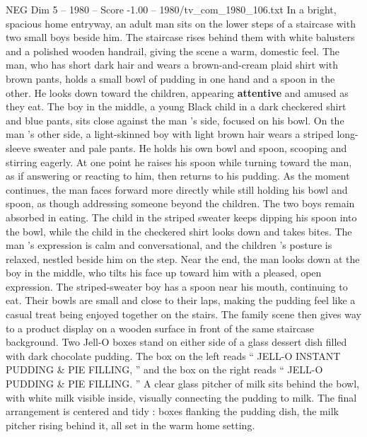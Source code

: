 \begin{textsample}{NEG Dim 5 – 1980 – Score -1.00 – 1980/tv\_com\_1980\_106.txt}  \label{ex:f5_neg_069}
In a bright, spacious home entryway, an adult man sits on the lower steps of a staircase with two small boys beside him.
The staircase rises behind them with white balusters and a polished wooden handrail, giving the scene a warm, domestic feel.
The man, who has short dark hair and wears a brown-and-cream plaid shirt with brown pants, holds a small bowl of pudding in one hand and a spoon in the other.
He looks down toward the children, appearing \textbf{attentive} and amused as they eat.
The boy in the middle, a young Black child in a dark checkered shirt and blue pants, sits close against the man ’s side, focused on his bowl.
On the man ’s other side, a light-skinned boy with light brown hair wears a striped long-sleeve sweater and pale pants.
He holds his own bowl and spoon, scooping and stirring eagerly.
At one point he raises his spoon while turning toward the man, as if answering or reacting to him, then returns to his pudding.
As the moment continues, the man faces forward more directly while still holding his bowl and spoon, as though addressing someone beyond the children.
The two boys remain absorbed in eating.
The child in the striped sweater keeps dipping his spoon into the bowl, while the child in the checkered shirt looks down and takes bites.
The man ’s expression is calm and conversational, and the children ’s posture is relaxed, nestled beside him on the step.
Near the end, the man looks down at the boy in the middle, who tilts his face up toward him with a pleased, open expression.
The striped-sweater boy has a spoon near his mouth, continuing to eat.
Their bowls are small and close to their laps, making the pudding feel like a casual treat being enjoyed together on the stairs.
The family scene then gives way to a product display on a wooden surface in front of the same staircase background.
Two Jell-O boxes stand on either side of a glass dessert dish filled with dark chocolate pudding.
The box on the left reads “ JELL-O INSTANT PUDDING \& PIE FILLING, ” and the box on the right reads “ JELL-O PUDDING \& PIE FILLING. ” A clear glass pitcher of milk sits behind the bowl, with white milk visible inside, visually connecting the pudding to milk.
The final arrangement is centered and tidy : boxes flanking the pudding dish, the milk pitcher rising behind it, all set in the warm home setting.

\end{textsample}
